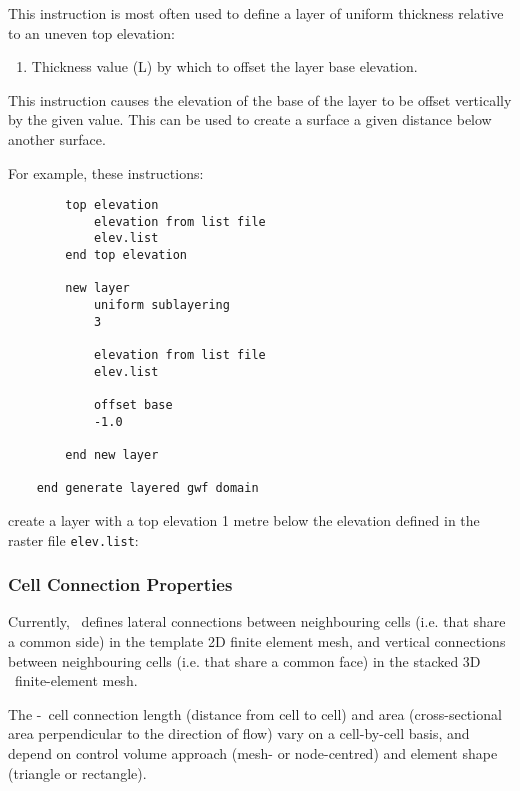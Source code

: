 {This instruction is most often used to define a layer of uniform thickness relative to an uneven top elevation:

    {\squish
    \begin{enumerate}
    \item {} Thickness value (L) by which to offset the layer base elevation.
    \end{enumerate}
    This instruction causes the elevation of the base of the layer to be offset vertically by the given value.  This
    can be used to create a surface a given distance below another surface.
}

    For example, these instructions:
\begin{verbatim}
        top elevation
            elevation from list file
            elev.list
        end top elevation

        new layer
            uniform sublayering
            3

            elevation from list file
            elev.list

            offset base
            -1.0

        end new layer

    end generate layered gwf domain
\end{verbatim}
 create a layer with a top elevation 1 metre below the elevation defined in the raster file \texttt{elev.list}:


\subsubsection{Cell Connection Properties}  
\label{section:GWFCellConnections}

Currently, \mut\ defines lateral connections between neighbouring cells (i.e. that share a common side) in the template 2D finite element mesh, and vertical connections between neighbouring cells (i.e. that share a common face) in the stacked 3D \gwf\ finite-element mesh.

The \gwf-\gwf\ cell connection length (distance from cell to cell) and area (cross-sectional area perpendicular to the direction of flow) vary on a cell-by-cell basis, and depend on control volume approach (mesh- or node-centred) and element shape (triangle or rectangle).

}
